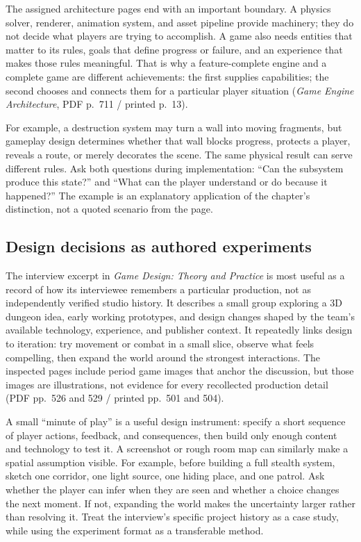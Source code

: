 The assigned architecture pages end with an important boundary. A physics solver, renderer, animation system, and asset pipeline provide machinery; they do not decide what players are trying to accomplish. A game also needs entities that matter to its rules, goals that define progress or failure, and an experience that makes those rules meaningful. That is why a feature-complete engine and a complete game are different achievements: the first supplies capabilities; the second chooses and connects them for a particular player situation (\emph{Game Engine Architecture}, PDF p.~711 / printed p.~13).

For example, a destruction system may turn a wall into moving fragments, but gameplay design determines whether that wall blocks progress, protects a player, reveals a route, or merely decorates the scene. The same physical result can serve different rules. Ask both questions during implementation: ``Can the subsystem produce this state?'' and ``What can the player understand or do because it happened?'' The example is an explanatory application of the chapter's distinction, not a quoted scenario from the page.

\subsection{Design decisions as authored experiments}\label{05-engine-i-ch009-design-decisions-as-authored-experiments}

The interview excerpt in \emph{Game Design: Theory and Practice} is most useful as a record of how its interviewee remembers a particular production, not as independently verified studio history. It describes a small group exploring a 3D dungeon idea, early working prototypes, and design changes shaped by the team's available technology, experience, and publisher context. It repeatedly links design to iteration: try movement or combat in a small slice, observe what feels compelling, then expand the world around the strongest interactions. The inspected pages include period game images that anchor the discussion, but those images are illustrations, not evidence for every recollected production detail (PDF pp.~526 and 529 / printed pp.~501 and 504).

A small ``minute of play'' is a useful design instrument: specify a short sequence of player actions, feedback, and consequences, then build only enough content and technology to test it. A screenshot or rough room map can similarly make a spatial assumption visible. For example, before building a full stealth system, sketch one corridor, one light source, one hiding place, and one patrol. Ask whether the player can infer when they are seen and whether a choice changes the next moment. If not, expanding the world makes the uncertainty larger rather than resolving it. Treat the interview's specific project history as a case study, while using the experiment format as a transferable method.


